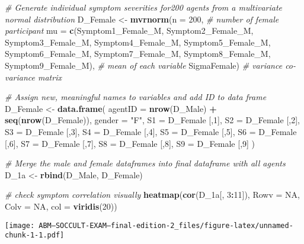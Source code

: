 \documentclass[]{article}
\newenvironment{Shaded}{\begin{snugshade}}{\end{snugshade}}
\newcommand{\KeywordTok}[1]{\textcolor[rgb]{0.13,0.29,0.53}{\textbf{#1}}}
\newcommand{\DataTypeTok}[1]{\textcolor[rgb]{0.13,0.29,0.53}{#1}}
\newcommand{\DecValTok}[1]{\textcolor[rgb]{0.00,0.00,0.81}{#1}}
\newcommand{\StringTok}[1]{\textcolor[rgb]{0.31,0.60,0.02}{#1}}
\newcommand{\CommentTok}[1]{\textcolor[rgb]{0.56,0.35,0.01}{\textit{#1}}}
\newcommand{\OtherTok}[1]{\textcolor[rgb]{0.56,0.35,0.01}{#1}}
\newcommand{\OperatorTok}[1]{\textcolor[rgb]{0.81,0.36,0.00}{\textbf{#1}}}
\newcommand{\NormalTok}[1]{#1}
\begin{document}
\begin{Shaded}
\begin{Highlighting}[]
\CommentTok{# Generate individual symptom severities for200 agents from a multivariate normal distribution}
\NormalTok{D_Female <-}\StringTok{ }\KeywordTok{mvrnorm}\NormalTok{(}\DataTypeTok{n =} \DecValTok{200}\NormalTok{, }\CommentTok{# number of female participant}
                    \DataTypeTok{mu =} \KeywordTok{c}\NormalTok{(Symptom1_Female_M, Symptom2_Female_M, Symptom3_Female_M, Symptom4_Female_M, Symptom5_Female_M, Symptom6_Female_M, Symptom7_Female_M, Symptom8_Female_M, Symptom9_Female_M), }\CommentTok{# mean of each variable}
\NormalTok{                    SigmaFemale) }\CommentTok{# variance co-variance matrix}

\CommentTok{# Assign new, meaningful names to variables and add ID to data frame}
\NormalTok{D_Female <-}\StringTok{ }\KeywordTok{data.frame}\NormalTok{(}
  \DataTypeTok{agentID =} \KeywordTok{nrow}\NormalTok{(D_Male) }\OperatorTok{+}\StringTok{ }\KeywordTok{seq}\NormalTok{(}\KeywordTok{nrow}\NormalTok{(D_Female)),}
  \DataTypeTok{gender =} \StringTok{"F"}\NormalTok{,}
  \DataTypeTok{S1 =}\NormalTok{ D_Female [,}\DecValTok{1}\NormalTok{],}
  \DataTypeTok{S2 =}\NormalTok{  D_Female [,}\DecValTok{2}\NormalTok{],}
  \DataTypeTok{S3 =}\NormalTok{  D_Female [,}\DecValTok{3}\NormalTok{],}
  \DataTypeTok{S4 =}\NormalTok{ D_Female [,}\DecValTok{4}\NormalTok{],}
  \DataTypeTok{S5 =}\NormalTok{ D_Female [,}\DecValTok{5}\NormalTok{],}
  \DataTypeTok{S6 =}\NormalTok{  D_Female [,}\DecValTok{6}\NormalTok{],}
  \DataTypeTok{S7 =}\NormalTok{  D_Female [,}\DecValTok{7}\NormalTok{],}
  \DataTypeTok{S8 =}\NormalTok{ D_Female [,}\DecValTok{8}\NormalTok{],}
  \DataTypeTok{S9 =}\NormalTok{ D_Female [,}\DecValTok{9}\NormalTok{]}
\NormalTok{)}

\CommentTok{# Merge the male and female dataframes into final dataframe with all agents}
\NormalTok{D_1a <-}\StringTok{ }\KeywordTok{rbind}\NormalTok{(D_Male, D_Female)}

\CommentTok{# check symptom correlation visually}
\KeywordTok{heatmap}\NormalTok{(}\KeywordTok{cor}\NormalTok{(D_1a[, }\DecValTok{3}\OperatorTok{:}\DecValTok{11}\NormalTok{]), }\DataTypeTok{Rowv =} \OtherTok{NA}\NormalTok{, }\DataTypeTok{Colv =} \OtherTok{NA}\NormalTok{, }\DataTypeTok{col =} \KeywordTok{viridis}\NormalTok{(}\DecValTok{20}\NormalTok{))}
\end{Highlighting}
\end{Shaded}

\texttt{[image: ABM---SOCCULT-EXAM---final-edition-2\_files/figure-latex/unnamed-chunk-1-1.pdf]}
\end{document}
